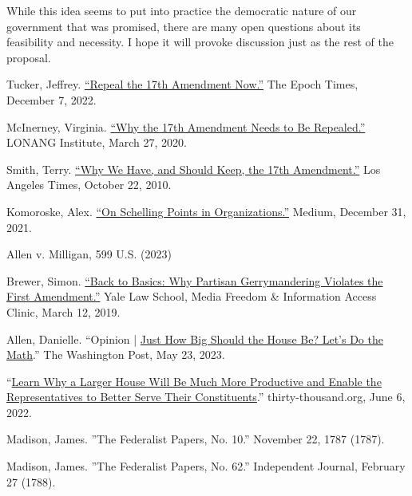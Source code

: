 \documentclass{article}
\begin{document}
While this idea seems to put into practice the democratic nature of our government that was promised, there are many open questions about its feasibility and necessity. I hope it will provoke discussion just as the rest of the proposal.


\begin{thebibliography}{20}
Tucker, Jeffrey. \href{https://www.theepochtimes.com/repeal-the-17th-amendment-now\_4909126.html}{“Repeal the 17th Amendment Now.”} The Epoch Times, December 7, 2022.

McInerney, Virginia. \href{https://lonang.com/commentaries/conlaw/federalism/repeal-seventeenth-amendment/}{“Why the 17th Amendment Needs to Be Repealed.”} LONANG Institute, March 27, 2020.

Smith, Terry. \href{https://www.latimes.com/archives/la-xpm-2010-oct-22-la-oew-smith-17th-amendment-20101022-story.html}{“Why We Have, and Should Keep, the 17th Amendment.”} Los Angeles Times, October 22, 2010.

Komoroske, Alex. \href{https://medium.com/@komorama/on-schelling-points-in-organizations-e90647cdd81b}{“On Schelling Points in Organizations.”} Medium, December 31, 2021.

Allen v. Milligan, 599 U.S. (2023)

Brewer, Simon. \href{https://law.yale.edu/mfia/case-disclosed/back-basics-why-partisan-gerrymandering-violates-first-amendment. }{“Back to Basics: Why Partisan Gerrymandering Violates the First Amendment.”} Yale Law School, Media Freedom \& Information Access Clinic, March 12, 2019.

Allen, Danielle. “Opinion | \href{https://www.washingtonpost.com/opinions/2023/03/28/danielle-allen-democracy-reform-house-representatives-districts/}{Just How Big Should the House Be? Let’s Do the Math}.” The Washington Post, May 23, 2023. 

“\href{https://thirty-thousand.org/the-house-of-representatives-is-scalable/}{Learn Why a Larger House Will Be Much More Productive and Enable the Representatives to Better Serve Their Constituents}.” thirty-thousand.org, June 6, 2022.

Madison, James. ”The Federalist Papers, No. 10.” November 22, 1787 (1787).

Madison, James. ”The Federalist Papers, No. 62.” Independent Journal, February 27 (1788).


\end{thebibliography}
\end{document}
